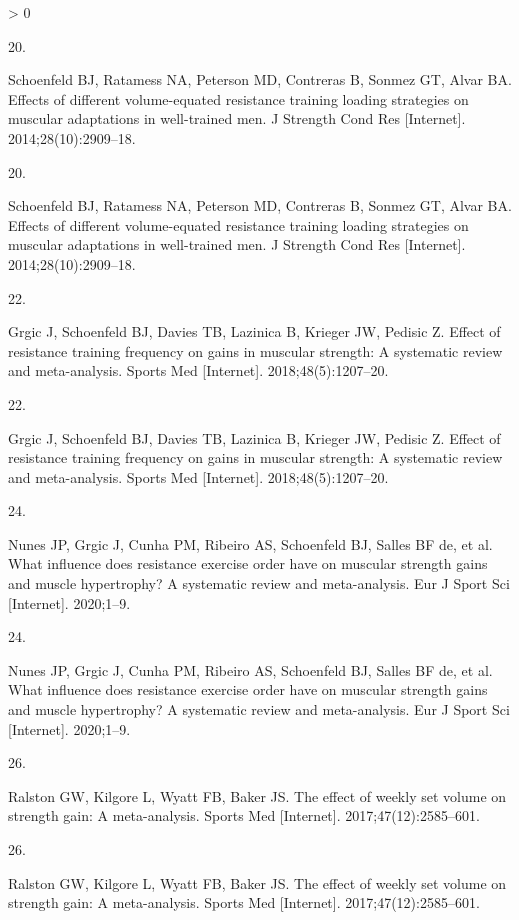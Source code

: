 \documentclass[twoside,10pt]{gihclass} %
\newlength{\cslhangindent}
\newlength{\csllabelwidth}
\newenvironment{CSLReferences}[3] %
 {%
  \setlength{\parindent}{0pt}
  \ifodd #1 \everypar{\setlength{\hangindent}{\cslhangindent}}\ignorespaces\fi
  \ifnum #2 > 0
  \setlength{\parskip}{#2\baselineskip}
  \fi
 }%
 {}
\newcommand{\CSLLeftMargin}[1]{\parbox[t]{\maxof{\widthof{#1}}{\csllabelwidth}}{#1}}
\newcommand{\CSLRightInline}[1]{\parbox[t]{\linewidth}{#1}}
\begin{document}
\begin{CSLReferences}{0}{0}
\leavevmode\hypertarget{ref-RN1612}{}%
\CSLLeftMargin{20. }
\CSLRightInline{Schoenfeld BJ, Ratamess NA, Peterson MD, Contreras B, Sonmez GT, Alvar BA. Effects of different volume-equated resistance training loading strategies on muscular adaptations in well-trained men. J Strength Cond Res {[}Internet{]}. 2014;28(10):2909--18. }

\leavevmode\hypertarget{ref-RN1612}{}%
\CSLLeftMargin{20. }
\CSLRightInline{Schoenfeld BJ, Ratamess NA, Peterson MD, Contreras B, Sonmez GT, Alvar BA. Effects of different volume-equated resistance training loading strategies on muscular adaptations in well-trained men. J Strength Cond Res {[}Internet{]}. 2014;28(10):2909--18. }

\leavevmode\hypertarget{ref-RN2570}{}%
\CSLLeftMargin{22. }
\CSLRightInline{Grgic J, Schoenfeld BJ, Davies TB, Lazinica B, Krieger JW, Pedisic Z. Effect of resistance training frequency on gains in muscular strength: A systematic review and meta-analysis. Sports Med {[}Internet{]}. 2018;48(5):1207--20. }

\leavevmode\hypertarget{ref-RN2570}{}%
\CSLLeftMargin{22. }
\CSLRightInline{Grgic J, Schoenfeld BJ, Davies TB, Lazinica B, Krieger JW, Pedisic Z. Effect of resistance training frequency on gains in muscular strength: A systematic review and meta-analysis. Sports Med {[}Internet{]}. 2018;48(5):1207--20. }

\leavevmode\hypertarget{ref-RN2591}{}%
\CSLLeftMargin{24. }
\CSLRightInline{Nunes JP, Grgic J, Cunha PM, Ribeiro AS, Schoenfeld BJ, Salles BF de, et al. What influence does resistance exercise order have on muscular strength gains and muscle hypertrophy? A systematic review and meta-analysis. Eur J Sport Sci {[}Internet{]}. 2020;1--9. }

\leavevmode\hypertarget{ref-RN2591}{}%
\CSLLeftMargin{24. }
\CSLRightInline{Nunes JP, Grgic J, Cunha PM, Ribeiro AS, Schoenfeld BJ, Salles BF de, et al. What influence does resistance exercise order have on muscular strength gains and muscle hypertrophy? A systematic review and meta-analysis. Eur J Sport Sci {[}Internet{]}. 2020;1--9. }

\leavevmode\hypertarget{ref-RN2492}{}%
\CSLLeftMargin{26. }
\CSLRightInline{Ralston GW, Kilgore L, Wyatt FB, Baker JS. The effect of weekly set volume on strength gain: A meta-analysis. Sports Med {[}Internet{]}. 2017;47(12):2585--601. }

\leavevmode\hypertarget{ref-RN2492}{}%
\CSLLeftMargin{26. }
\CSLRightInline{Ralston GW, Kilgore L, Wyatt FB, Baker JS. The effect of weekly set volume on strength gain: A meta-analysis. Sports Med {[}Internet{]}. 2017;47(12):2585--601. }


\end{CSLReferences}
\end{document}
